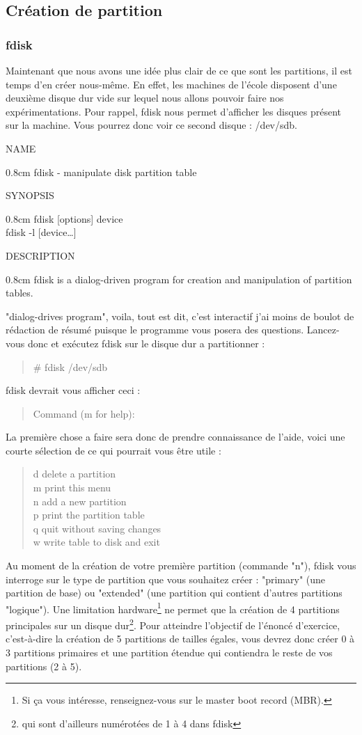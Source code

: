 \documentclass[a4paper,11pt]{article}
\newcommand{\commande}[1] {
    \begin{quote}
    \tt\raggedright #1 
    \end{quote}
}
\newcommand{\man}[2]{
    \begin{tcolorbox}[toprule=3mm,width=\textwidth,outer arc=0mm,colbacktitle=grayman,coltitle=black,colback={grayman},colframe={grayman},title={man : \tt #1}]
        \tt\raggedright #2
    \end{tcolorbox}
}
\newcommand{\mandesc}[1]{
    \begin{adjustwidth}{0.8cm}{}
        #1
    \end{adjustwidth}
}
\begin{document}
\subsection{Création de partition}
\subsubsection{fdisk}
\par Maintenant que nous avons une idée plus clair de ce que sont les partitions, il est temps d'en créer nous-même. En effet, les machines de l'école disposent d'une deuxième disque dur vide sur lequel nous allons pouvoir faire nos expérimentations. Pour rappel, fdisk nous permet d'afficher les disques présent sur la machine. Vous pourrez donc voir ce second disque : /dev/sdb.
\man{fdisk}{NAME
\mandesc{fdisk - manipulate disk partition table}
SYNOPSIS
\mandesc{fdisk [options] device\\
fdisk -l [device\dots]}
DESCRIPTION
\mandesc{fdisk is a dialog-driven program for creation and manipulation of partition tables.}
}
\par "dialog-drives program", voila, tout est dit, c'est interactif j'ai moins de boulot de rédaction de résumé puisque le programme vous posera des questions. Lancez-vous donc et exécutez fdisk sur le disque dur a partitionner :
\commande{\# fdisk /dev/sdb}
\par fdisk devrait vous afficher ceci :
\commande{Command (m for help):}
\par La première chose a faire sera donc de prendre connaissance de l'aide, voici une courte sélection de ce qui pourrait vous être utile :
\commande{d delete a partition\\
m print this menu\\
n add a new partition\\
p print the partition table\\
q quit without saving changes\\
w write table to disk and exit}
\par Au moment de la création de votre première partition (commande "n"), fdisk vous interroge sur le type de partition que vous souhaitez créer : "primary" (une partition de base) ou "extended" (une partition qui contient d'autres partitions "logique"). Une limitation hardware\footnote{Si ça vous intéresse, renseignez-vous sur le master boot record (MBR).} ne permet que la création de 4 partitions principales sur un disque dur\footnote{qui sont d'ailleurs numérotées de 1 à 4 dans fdisk}. Pour atteindre l'objectif de l'énoncé d'exercice, c'est-à-dire la création de 5 partitions de tailles égales, vous devrez donc créer 0 à 3 partitions primaires et une partition étendue qui contiendra le reste de vos partitions (2 à 5).
\end{document}
